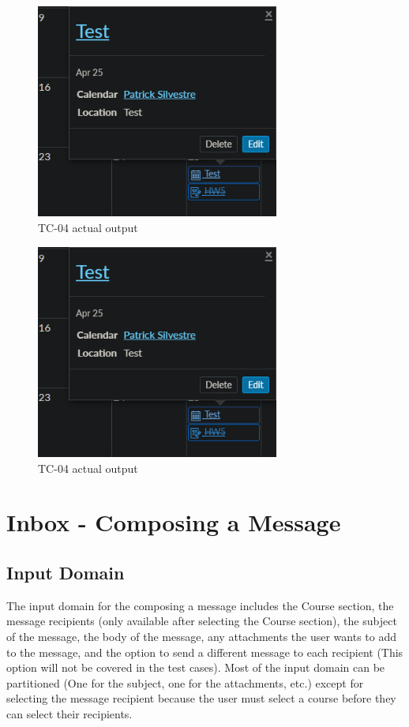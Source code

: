 \documentclass[10pt,letterpaper]{article}
\begin{document}
\begin{figure}[h!]
	\centerline{\includegraphics[width=8cm]{screenshots/tc04-actual-output.png}}
	\caption{TC-04 actual output}
\end{figure}
\begin{figure}[h!]
	\centerline{\includegraphics[width=8cm]{screenshots/tc04-actual-output.png}}
	\caption{TC-04 actual output}
\end{figure}

\newpage
\section{Inbox - Composing a Message}
\subsection{Input Domain}
The input domain for the composing a message includes the Course section, the message recipients (only available after selecting the Course section), the subject of the message, the body of the message, any attachments the user wants to add to the message, and the option to send a different message to each recipient (This option will not be covered in the test cases).
Most of the input domain can be partitioned (One for the subject, one for the attachments, etc.) except for selecting the message recipient because the user must select a course before they can select their recipients.
\end{document}
